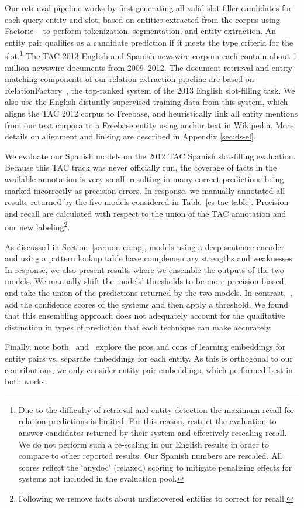 Our retrieval pipeline works by first generating all valid slot filler candidates for each query entity and slot, based on entities extracted from the corpus using {\sc Factorie} ~\citep{mccallum09:factorie:} to perform tokenization, segmentation, and entity extraction. 
An entity pair qualifies as a candidate prediction if it meets the type criteria for the slot.\footnote{Due to the difficulty of retrieval and entity detection the maximum recall for relation predictions is limited. For this reason, \citet{surdeanu2012multi} restrict the evaluation to answer candidates returned by their system and effectively rescaling recall. We do not perform such a re-scaling in our English results in order to compare to other reported results. Our Spanish numbers are rescaled. All scores reflect the `anydoc' (relaxed) scoring to mitigate penalizing effects for systems not included in the evaluation pool.} The TAC 2013 English and Spanish newswire corpora each contain about 1 million newswire documents from 2009--2012. The document retrieval and entity matching components of our relation extraction pipeline are based on RelationFactory~\citep{roth2014relationfactory}, the top-ranked system of the 2013 English slot-filling task. We also use the English distantly supervised training data from this system, which aligns the TAC 2012 corpus to Freebase, and heuristically link all entity mentions from our text corpora to a Freebase entity using anchor text in Wikipedia. More details on alignment and linking are described in Appendix \ref{sec:ds-el}.


We evaluate our Spanish models on the 2012 TAC Spanish slot-filling evaluation. Because this TAC track was never officially run, the coverage of facts in the available annotation is very small, resulting in many correct predictions being marked incorrectly as precision errors. In response, we manually annotated all results returned by the five models considered in Table~\ref{es-tac-table}. Precision and recall are calculated with respect to the union of the TAC annotation and our new labeling\footnote{Following \citet{surdeanu2012multi} we remove facts about undiscovered entities to correct for recall.}.

As discussed in Section~\ref{sec:non-comp}, models using a deep sentence encoder and using a pattern lookup table have complementary strengths and weaknesses. In response, we also present results where we ensemble the outputs of the two models.  We manually shift the models' thresholds to be more precision-biased, and take the union of the predictions returned by the two models. In contrast,~\citet{toutanova2015representing}, add the confidence scores of the systems and then apply a threshold. We found that this ensembling approach does not adequately account for the qualitative distinction in types of prediction that each technique can make accurately. 


Finally, note both~\citet{toutanova2015representing} and~\citet{limin} explore the pros and cons of learning embeddings for entity pairs vs. separate embeddings for each entity. As this is orthogonal to our contributions, we only consider entity pair embeddings, which performed best in both works.
